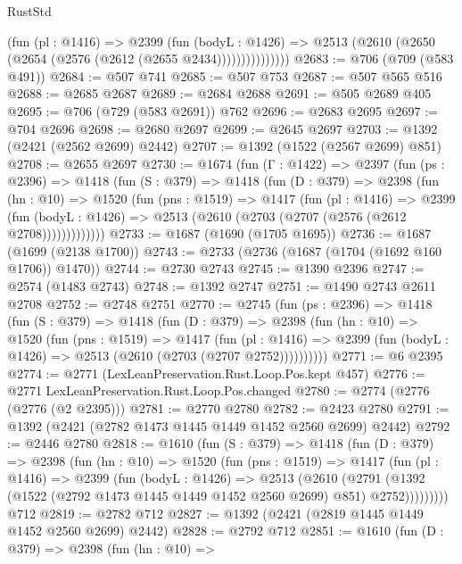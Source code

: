 \begin{lexlean}{RustStd}
\begin{coremodule}
                  (fun (pl : @1416) =>
                  @2399
                    (fun (bodyL : @1426) =>
                    @2513 (@2610 (@2650 (@2654 (@2576 (@2612 (@2655 @2434)))))))))))))))
@2683 := @706 (@709 (@583 @491))
@2684 := @507 @741
@2685 := @507 @753
@2687 := @507 @565 @516
@2688 := @2685 @2687
@2689 := @2684 @2688
@2691 := @505 @2689 @405
@2695 := @706 (@729 (@583 @2691)) @762
@2696 := @2683 @2695
@2697 := @704 @2696
@2698 := @2680 @2697
@2699 := @2645 @2697
@2703 := @1392 (@2421 (@2562 @2699) @2442)
@2707 := @1392 (@1522 (@2567 @2699) @851)
@2708 := @2655 @2697
@2730 := @1674
    (fun (Γ : @1422) =>
    @2397
      (fun (ps : @2396) =>
      @1418
        (fun (S : @379) =>
        @1418
          (fun (D : @379) =>
          @2398
            (fun (hn : @10) =>
            @1520
              (fun (pns : @1519) =>
              @1417
                (fun (pl : @1416) =>
                @2399
                  (fun (bodyL : @1426) =>
                  @2513 (@2610 (@2703 (@2707 (@2576 (@2612 @2708)))))))))))))
@2733 := @1687 (@1690 (@1705 @1695))
@2736 := @1687 (@1699 (@2138 @1700))
@2743 := @2733 (@2736 (@1687 (@1704 (@1692 @160 @1706)) @1470))
@2744 := @2730 @2743
@2745 := @1390 @2396
@2747 := @2574 (@1483 @2743)
@2748 := @1392 @2747
@2751 := @1490 @2743 @2611 @2708
@2752 := @2748 @2751
@2770 := @2745
    (fun (ps : @2396) =>
    @1418
      (fun (S : @379) =>
      @1418
        (fun (D : @379) =>
        @2398
          (fun (hn : @10) =>
          @1520
            (fun (pns : @1519) =>
            @1417
              (fun (pl : @1416) =>
              @2399 (fun (bodyL : @1426) => @2513 (@2610 (@2703 (@2707 @2752))))))))))
@2771 := @6 @2395
@2774 := @2771 (LexLeanPreservation.Rust.Loop.Pos.kept @457)
@2776 := @2771 LexLeanPreservation.Rust.Loop.Pos.changed
@2780 := @2774 (@2776 (@2776 (@2 @2395)))
@2781 := @2770 @2780
@2782 := @2423 @2780
@2791 := @1392 (@2421 (@2782 @1473 @1445 @1449 @1452 @2560 @2699) @2442)
@2792 := @2446 @2780
@2818 := @1610
    (fun (S : @379) =>
    @1418
      (fun (D : @379) =>
      @2398
        (fun (hn : @10) =>
        @1520
          (fun (pns : @1519) =>
          @1417
            (fun (pl : @1416) =>
            @2399
              (fun (bodyL : @1426) =>
              @2513
                (@2610
                  (@2791
                    (@1392 (@1522 (@2792 @1473 @1445 @1449 @1452 @2560 @2699) @851) @2752)))))))))
    @712
@2819 := @2782 @712
@2827 := @1392 (@2421 (@2819 @1445 @1449 @1452 @2560 @2699) @2442)
@2828 := @2792 @712
@2851 := @1610
    (fun (D : @379) =>
    @2398
      (fun (hn : @10) =>

\end{coremodule}
\end{lexlean}
